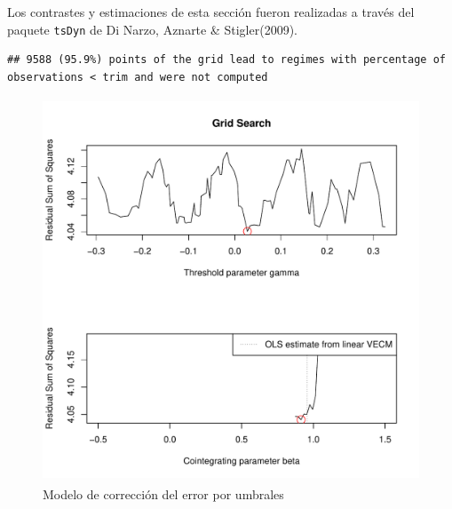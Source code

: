 \documentclass[12pt, twoside]{book}\usepackage[]{graphicx}\usepackage[]{color}
\makeatletter
\newenvironment{kframe}{%
 \def\at@end@of@kframe{}%
 \ifinner\ifhmode%
  \def\at@end@of@kframe{\end{minipage}}%
  \begin{minipage}{\columnwidth}%
 \fi\fi%
 \def\FrameCommand##1{\hskip\@totalleftmargin \hskip-\fboxsep
 \colorbox{shadecolor}{##1}\hskip-\fboxsep
     \hskip-\linewidth \hskip-\@totalleftmargin \hskip\columnwidth}%
 \MakeFramed {\advance\hsize-\width
   \@totalleftmargin\z@ \linewidth\hsize
   \@setminipage}}%
 {\par\unskip\endMakeFramed%
 \at@end@of@kframe}
\newenvironment{knitrout}{}{} %
\numberwithin{equation}{section}
\numberwithin{theorem}{section}
\numberwithin{teorema}{section}
\numberwithin{defi}{section}
\numberwithin{prop}{section}
\numberwithin{defi}{section}
\theoremstyle{plain}
\makeatother
\begin{document}
Los contrastes y estimaciones de esta sección fueron realizadas a través del paquete \texttt{tsDyn} de Di Narzo, Aznarte \& Stigler(2009).


\begin{knitrout}
\color{fgcolor}\begin{kframe}
\begin{verbatim}
## 9588 (95.9%) points of the grid lead to regimes with percentage of observations < trim and were not computed
\end{verbatim}
\end{kframe}\begin{figure}[H]

{\centering \includegraphics[width=4.5in,height=4.5in]{figure/fig-5_9-1} 

}

\caption[Modelo de corrección del error por umbrales]{Modelo de corrección del error por umbrales}\label{fig:fig-5.9}
\end{figure}


\end{knitrout}
\end{document}
